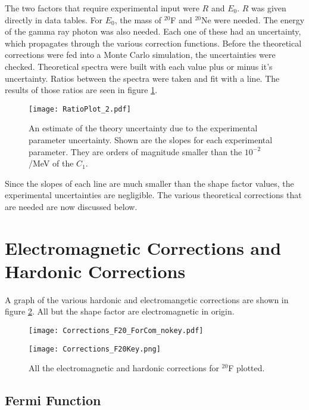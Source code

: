 \documentclass[main.tex]{subfiles}
\begin{document}
The two factors that require experimental input were $R$ and $E_{0}$. 
$R$ was given directly in data tables.
For $E_{0}$, the mass of $^{20}$F and $^{20}$Ne were needed.
The energy of the gamma ray photon was also needed.
Each one of these had an uncertainty, which propagates through the various correction functions.
Before the theoretical corrections were fed into a Monte Carlo simulation, the uncertainties were checked.
Theoretical spectra were  built with each value plus or minus it's uncertainty.
Ratios between the spectra were taken and fit with a line.
The results of those ratios are seen in figure \ref{fig:theoryuncer}.

\begin{figure}[!htb]
	\centerline{\texttt{[image: RatioPlot\_2.pdf]}}
	\caption{An estimate of the theory uncertainty due to the experimental parameter uncertainty.	
		 Shown are the slopes for each experimental parameter. 
		 They are orders of magnitude smaller than the $10^{-2}$/MeV of the $C_{1}$.}
	\label{fig:theoryuncer}
\end{figure}

Since the slopes of each line are much smaller than the shape factor values, the experimental uncertainties are negligible. 
The various theoretical corrections that are needed are now discussed below.

\section{Electromagnetic Corrections and Hardonic Corrections}
A graph of the various hardonic and electromangetic corrections are shown in figure \ref{fig:corrections}.
All but the shape factor are electromagnetic in origin. 

\begin{figure}
    \centering
    \begin{minipage}{0.65\textwidth}
        \centerline{\texttt{[image: Corrections\_F20\_ForCom\_nokey.pdf]}} %
    \end{minipage}\hfill
    \begin{minipage}{0.35\textwidth}
        \centerline{\texttt{[image: Corrections\_F20Key.png]}}
    \end{minipage}
    \caption{All the electromagnetic and hardonic corrections for $^{20}$F plotted.}
    \label{fig:corrections}
\end{figure}

\subsection{Fermi Function}
\end{document}
